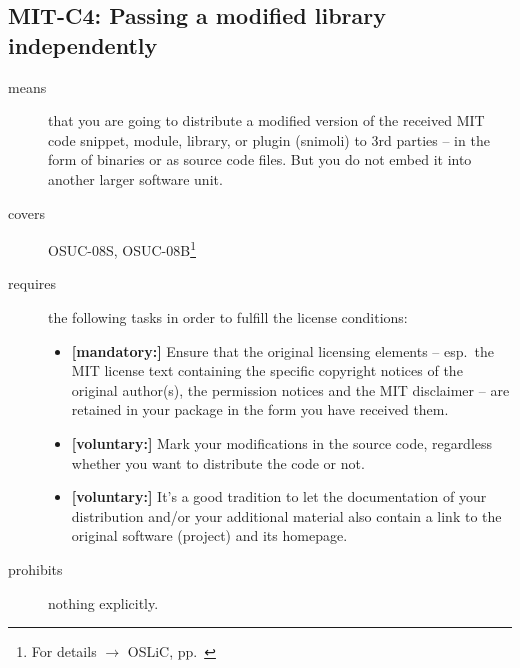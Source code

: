 \subsection{MIT-C4: Passing a modified library independently}
\label{OSUC-08S-MIT}\label{OSUC-08B-MIT}
\begin{description}
\item[means] that you are going to distribute a modified version of the received
MIT code snippet, module, library, or plugin (snimoli) to 3rd parties -- in the
form of binaries or as source code files. But you do not embed it into another
larger software unit.

\item[covers] OSUC-08S, OSUC-08B\footnote{For details $\rightarrow$ OSLiC, pp.\
\pageref{OSUC-08S-DEF}}
\item[requires] the following tasks in order to fulfill the license conditions:
\begin{itemize}
  \item \textbf{[mandatory:]} Ensure that the original licensing elements -- esp.\
  the MIT license text containing the specific copyright notices of the original
  author(s), the permission notices and the MIT disclaimer -- are retained in
  your package in the form you have received them.
  \item \textbf{[voluntary:]} Mark your modifications in the source code,
  regardless whether you want to distribute the code or not.
  \item \textbf{[voluntary:]} It's a good tradition to let the documentation of
  your distribution and/or your additional material also contain a link to the
  original software (project) and its homepage.
\end{itemize}
\item[prohibits] nothing explicitly.
\end{description}


